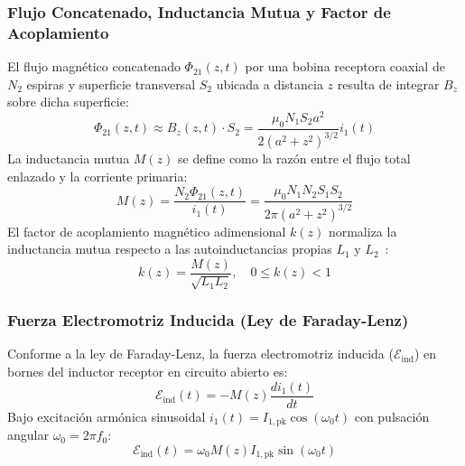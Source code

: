 \subsubsection{Flujo Concatenado, Inductancia Mutua y Factor de Acoplamiento}
El flujo magnético concatenado $\Phi_{21}(z, t)$ por una bobina receptora coaxial de $N_2$ espiras y superficie transversal $S_2$ ubicada a distancia $z$ resulta de integrar $B_z$ sobre dicha superficie:
\begin{equation}
    \Phi_{21}(z, t) \approx B_z(z, t) \cdot S_2 = \frac{\mu_0 N_1 S_2 a^2}{2 (a^2 + z^2)^{3/2}} i_1(t)
    \label{eq:flujo_concatenado}
\end{equation}
La inductancia mutua $M(z)$ se define como la razón entre el flujo total enlazado y la corriente primaria:
\begin{equation}
    M(z) = \frac{N_2 \Phi_{21}(z, t)}{i_1(t)} = \frac{\mu_0 N_1 N_2 S_1 S_2}{2\pi (a^2 + z^2)^{3/2}}
    \label{eq:inductancia_mutua}
\end{equation}
El factor de acoplamiento magnético adimensional $k(z)$ normaliza la inductancia mutua respecto a las autoinductancias propias $L_1$ y $L_2$~\cite{lee2003antenna}:
\begin{equation}
    k(z) = \frac{M(z)}{\sqrt{L_1 L_2}}, \quad 0 \le k(z) < 1
    \label{eq:factor_acoplamiento}
\end{equation}

\subsubsection{Fuerza Electromotriz Inducida (Ley de Faraday-Lenz)}
Conforme a la ley de Faraday-Lenz, la fuerza electromotriz inducida ($\mathcal{E}_{\text{ind}}$) en bornes del inductor receptor en circuito abierto es:
\begin{equation}
    \mathcal{E}_{\text{ind}}(t) = - M(z) \frac{d i_1(t)}{dt}
    \label{eq:faraday}
\end{equation}
Bajo excitación armónica sinusoidal $i_1(t) = I_{1,\text{pk}} \cos(\omega_0 t)$ con pulsación angular $\omega_0 = 2\pi f_0$:
\begin{equation}
    \mathcal{E}_{\text{ind}}(t) = \omega_0 M(z) I_{1,\text{pk}} \sin(\omega_0 t)
    \label{eq:fem_armonica}
\end{equation}

